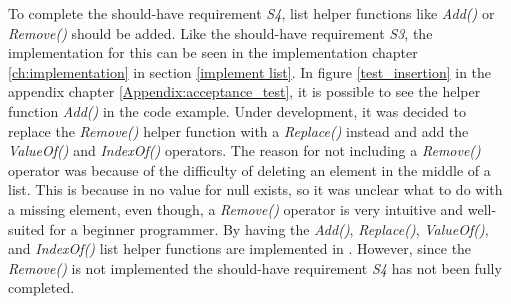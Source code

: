 To complete the should-have requirement \textit{S4}, list helper functions like \textit{Add()} or \textit{Remove()} should be added. Like the should-have requirement \textit{S3}, the implementation for this can be seen in the implementation chapter \ref{ch:implementation} in section \ref{implement list}. In figure \ref{test_insertion} in the appendix chapter \ref{Appendix:acceptance_test}, it is possible to see the helper function \textit{Add()} in the code example. Under development, it was decided to replace the \textit{Remove()} helper function with a \textit{Replace()} instead and add the \textit{ValueOf()} and \textit{IndexOf()} operators. The reason for not including a \textit{Remove()} operator was because of the difficulty of deleting an element in the middle of a list. This is because in \lang no value for null exists, so it was unclear what to do with a missing element, even though, a \textit{Remove()} operator is very intuitive and well-suited for a beginner programmer. By having the \textit{Add()}, \textit{Replace()}, \textit{ValueOf()}, and \textit{IndexOf()} list helper functions are implemented in \lang. However, since the \textit{Remove()} is not implemented the should-have requirement \textit{S4} has not been fully completed.
\\
